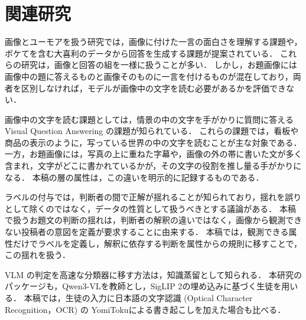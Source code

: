 \section{関連研究}
\label{sec_related}
画像とユーモアを扱う研究では，画像に付けた一言の面白さを理解する課題\cite{ref_newyorker}や，ボケてを含む大喜利のデータから回答を生成する課題\cite{ref_oogirigo}が提案されている．
これらの研究は，画像と回答の組を一様に扱うことが多い．
しかし，お題画像には画像中の題に答えるものと画像そのものに一言を付けるものが混在しており，両者を区別しなければ，モデルが画像中の文字を読む必要があるかを評価できない．

画像中の文字を読む課題としては，情景の中の文字を手がかりに質問に答える Visual Question Answering の課題\cite{ref_textvqa,ref_stvqa}が知られている．
これらの課題では，看板や商品の表示のように，写っている世界の中の文字を読むことが主な対象である．
一方，お題画像には，写真の上に重ねた字幕や，画像の外の帯に書いた文が多く含まれ，文字がどこに書かれているかが，その文字の役割を推し量る手がかりになる．
本稿の層の属性は，この違いを明示的に記録するものである．

ラベルの付与では，判断者の間で正解が揺れることが知られており，揺れを誤りとして除くのではなく，データの性質として扱うべきとする議論がある\cite{ref_hlv}．
本稿で扱うお題文の判断の揺れは，判断者の解釈の違いではなく，画像から観測できない投稿者の意図を定義が要求することに由来する．
本稿では，観測できる属性だけでラベルを定義し，解釈に依存する判断を属性からの規則に移すことで，この揺れを扱う．

VLM の判定を高速な分類器に移す方法は，知識蒸留\cite{ref_kd}として知られる．
本研究のパッケージも，Qwen3-VL\cite{ref_qwen3vl}を教師とし，SigLIP 2\cite{ref_siglip2}の埋め込みに基づく生徒を用いる．
本稿では，生徒の入力に日本語の文字認識 (Optical Character Recognition，OCR) の YomiToku\cite{ref_yomitoku}による書き起こしを加えた場合も比べる．
